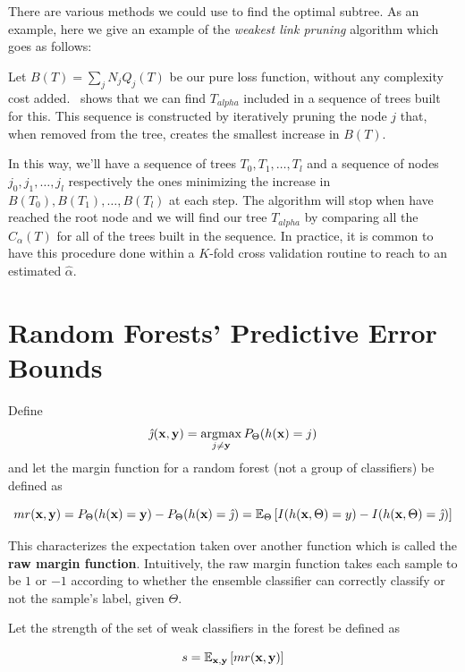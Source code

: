 \begin{appendices}
There are various methods we could use to find the optimal subtree. As an example, here we give an example of the \textit{weakest link pruning} algorithm which goes as follows:

Let $B(T) = \sum_{j} N_j Q_j(T) $ be our pure loss function, without any complexity cost added.~\cite{breiman-cart84} shows that we can find $T_{alpha}$ included in a sequence of trees built for this. This sequence is constructed by iteratively pruning the node $j$ that, when removed from the tree, creates the smallest increase in $B(T)$.


In this way, we'll have a sequence of trees $T_0,T_1,\ldots,T_l$ and a sequence of nodes $j_0, j_1,\ldots,j_l$ respectively the ones minimizing the increase in $B(T_0),B(T_1),\ldots,B(T_l)$ at each step. The algorithm will stop when have reached the root node and we will find our tree $T_{alpha}$ by comparing all the $C_\alpha(T)$ for all of the trees built in the sequence. In practice, it is common to have this procedure done within a $K$-fold cross validation routine to reach to an estimated $\hat{\alpha}$.


\section{Random Forests' Predictive Error Bounds}\label{appx:sec:rforest_predictive_error_bounds}


Define $$\hat{\jmath}( \textbf{x},\textbf{y}) = \operatorname*{argmax}_{j \neq \textbf{y}} P_{\Theta}(h(\textbf{x}) = j)$$ and let the margin function for a random forest (not a group of classifiers) be defined as

\[\label{eq:rf-marginFunRf}
mr(\textbf{x},\textbf{y}) = P_{\Theta}(h(\textbf{x}) = \textbf{y}) - P_{\Theta}(h(\textbf{x}) = \hat{\jmath})
\\
= \operatorname{\mathbb{E}}_{\Theta} \left[ I(h(\textbf{x},\Theta ) = y ) - I( h( \textbf{x},\Theta ) = \hat{\jmath} ) \right]
\]

This characterizes the expectation taken over another function which is called the \textbf{raw margin function}\label{eq:rf-rawMarginFun}.
Intuitively, the raw margin function takes each sample to be $1$ or $-1$ according to whether the ensemble classifier can correctly classify or not the sample's label, given $\Theta$.

Let the strength of the set of weak classifiers in the forest be defined as

\begin{equation}\label{eq:rf-strength}
s = \operatorname{\mathbb{E}}_{\textbf{x},\textbf{y}} \left[ mr(\textbf{x},\textbf{y} ) \right]
\end{equation}


\end{appendices}
